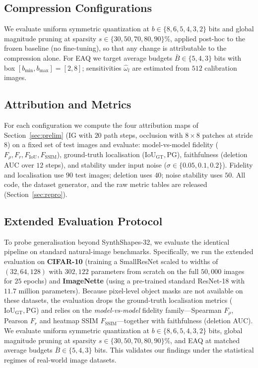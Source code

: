 \subsection{Compression Configurations}
We evaluate uniform symmetric quantization at $b\in\{8,6,5,4,3,2\}$ bits and
global magnitude pruning at sparsity $s\in\{30,50,70,80,90\}\%$, applied
post-hoc to the frozen baseline (no fine-tuning), so that any change is
attributable to the compression alone. For EAQ we target average budgets
$\bar B\in\{5,4,3\}$ bits with box $[b_{\min},b_{\max}]=[2,8]$; sensitivities
$\hat\omega_l$ are estimated from $512$ calibration images.

\subsection{Attribution and Metrics}
For each configuration we compute the four attribution maps of
Section~\ref{sec:prelim} (IG with $20$ path steps, occlusion with $8\times8$
patches at stride $8$) on a fixed set of test images and evaluate: model-vs-model
fidelity ($F_\rho,F_r,F_{\mathrm{IoU}},F_{\mathrm{SSIM}}$), ground-truth
localisation ($\mathrm{IoU}_{\mathrm{GT}},\mathrm{PG}$), faithfulness (deletion
AUC over $12$ steps), and stability under input noise ($\sigma\in\{0.05,0.1,
0.2\}$). Fidelity and localisation use $90$ test images; deletion uses $40$;
noise stability uses $50$. All code, the dataset generator, and the raw metric
tables are released (Section~\ref{sec:repro}).

\subsection{Extended Evaluation Protocol}
\label{sec:setup-extended}
To probe generalisation beyond SynthShapes-32, we evaluate the identical pipeline on standard natural-image benchmarks. Specifically, we run the extended evaluation on \textbf{CIFAR-10} (training a SmallResNet scaled to widths of $(32,64,128)$ with $302{,}122$ parameters from scratch on the full $50{,}000$ images for $25$ epochs) and \textbf{ImageNette} (using a pre-trained standard ResNet-18 with $11.7$ million parameters). Because pixel-level object masks are not available on these datasets, the evaluation drops the ground-truth localisation metrics ($\mathrm{IoU}_{\mathrm{GT}},\mathrm{PG}$) and relies on the \emph{model-vs-model} fidelity family---Spearman $F_\rho$, Pearson $F_r$ and heatmap SSIM $F_{\mathrm{SSIM}}$---together with faithfulness (deletion AUC). We evaluate uniform symmetric quantization at $b\in\{8,6,5,4,3,2\}$ bits, global magnitude pruning at sparsity $s\in\{30,50,70,80,90\}\%$, and EAQ at matched average budgets $\bar{B}\in\{5,4,3\}$ bits. This validates our findings under the statistical regimes of real-world image datasets.
